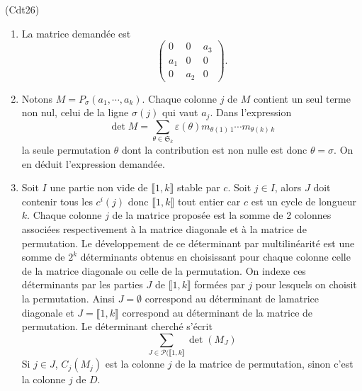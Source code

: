 \begin{tiny}(Cdt26)\end{tiny}
\begin{enumerate}
  \item La matrice demandée est
\begin{displaymath}
  \begin{pmatrix}
    0   & 0   & a_3 \\
    a_1 & 0   & 0 \\
    0   & a_2 & 0
  \end{pmatrix}.
\end{displaymath}

  \item Notons $M = P_\sigma(a_1,\cdots,a_k)$. Chaque colonne $j$ de $M$ contient un seul terme non nul, celui de la ligne $\sigma(j)$ qui vaut $a_j$. Dans l'expression
\begin{displaymath}
  \det M =
\sum_{\theta \in \mathfrak{S}_k} \varepsilon(\theta) m_{\theta(1)\, 1} \cdots m_{\theta(k)\, k}
\end{displaymath}
la seule permutation $\theta$ dont la contribution est non nulle est donc $\theta = \sigma$. On en déduit l'expression demandée.
  \item Soit $I$ une partie non vide de $\llbracket 1,k \rrbracket$ stable par $c$.\newline
  Soit $j \in I$, alors $J$ doit contenir tous les $c^i(j)$ donc $\llbracket 1,k \rrbracket$ tout entier car $c$ est un cycle de longueur $k$.\newline
  Chaque colonne $j$ de la matrice proposée est la somme de 2 colonnes associées respectivement à la matrice diagonale et à la matrice de permutation.\newline
  Le développement de ce déterminant par multilinéarité est une somme de $2^k$ déterminants obtenus en choisissant pour chaque colonne celle de la matrice diagonale ou celle de la permutation. On indexe ces déterminants par les parties $J$ de $\llbracket 1, k \rrbracket$ formées par $j$ pour lesquels on choisit la permutation.\newline
  Ainsi $J= \emptyset$ correspond au déterminant de lamatrice diagonale et $J= \llbracket 1, k \rrbracket$ correspond au déterminant de la matrice de permutation. Le déterminant cherché s'écrit
  \begin{displaymath}
    \sum_{J \in \mathcal{P}(\llbracket 1,k \rrbracket} \det(M_J)
  \end{displaymath}
Si $j \in J$, $C_j(M_j)$ est la colonne $j$ de la matrice de permutation, sinon c'est la colonne $j$ de $D$.\newline

\end{enumerate}
